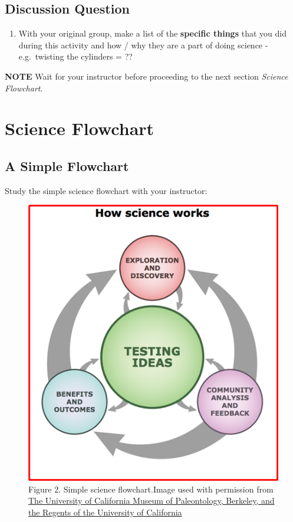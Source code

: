 \documentclass[
]{book}
\providecommand{\tightlist}{%
  \setlength{\itemsep}{0pt}\setlength{\parskip}{0pt}}
\begin{document}
\hypertarget{discussion-question}{%
\subsection*{Discussion Question}\label{discussion-question}}

\begin{enumerate}
\def\labelenumi{\arabic{enumi}.}
\tightlist
\item
  With your original group, make a list of the \textbf{specific things} that you did during this activity and how / why they are a part of doing science - e.g.~twisting the cylinders = ??
\end{enumerate}

\textbf{NOTE} Wait for your instructor before proceeding to the next section \emph{Science Flowchart}.

\hypertarget{science-flowchart}{%
\section*{Science Flowchart}\label{science-flowchart}}

\hypertarget{a-simple-flowchart}{%
\subsection*{A Simple Flowchart}\label{a-simple-flowchart}}

Study the simple science flowchart with your instructor:

\begin{figure}
\centering
\includegraphics{figures_images/Lab2a-Fig2.png}
\caption{Figure 2. Simple science flowchart.Image used with permission from \href{www.understandingscience.org}{The University of California Museum of Paleontology, Berkeley, and the Regents of the University of California}}
\end{figure}
\end{document}
